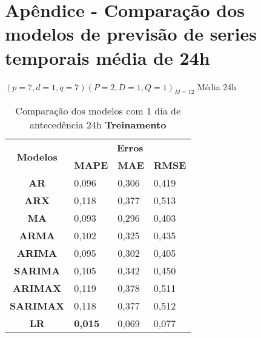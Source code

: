 
\section{Ap\^endice - Compara\c c\~ao dos modelos de previs\~ao de series temporais m\'edia de 24h}\label{sec:comtb24}



$(p = 7,d = 1,q = 7) (P = 2,D = 1,Q = 1)_{M = 12}$ Média 24h

	\begin{table}[H]
	\centering
	\caption{Comparação dos modelos com 1 dia de antecedência 24h \textbf{Treinamento} }\label{tb:1-24trn}
	\begin{tabular}{@{}clll@{}}
		\toprule
		\multirow{2}{*}{\textbf{Modelos}} & \multicolumn{3}{c}{\textbf{Erros}}                                                                       \\ \cmidrule(l){2-4} 
		& \multicolumn{1}{c}{\textbf{MAPE}} & \multicolumn{1}{c}{\textbf{MAE}} & \multicolumn{1}{c}{\textbf{RMSE}} \\ \hline
\textbf{AR}                       & 0,096                             & 0,306                            & 0,419                             \\
\textbf{ARX}                      & 0,118                             & 0,377                            & 0,513                             \\
\textbf{MA}                       & 0,093                             & 0,296                            & 0,403                             \\
\textbf{ARMA}                     & 0,102                             & 0,325                            & 0,435                             \\
\textbf{ARIMA}                    & 0,095                             & 0,302                            & 0,405                             \\
\textbf{SARIMA}                   & 0,105                             & 0,342                            & 0,450                             \\
\textbf{ARIMAX}                   & 0,119                             & 0,378                            & 0,511                             \\
\textbf{SARIMAX}                  & 0,118                             & 0,377                            & 0,512                             \\
\textbf{LR}                       & \textbf{0,015}                             & 0,069                            & 0,077                             \\

\end{tabular}
\end{table}
